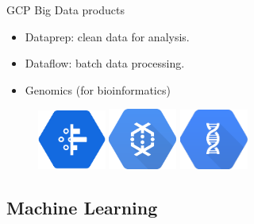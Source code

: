 \documentclass{beamer}
\begin{document}
\begin{frame}[fragile]{GCP Big Data products}
  \begin{itemize}[<+->]
    \item Dataprep: clean data for analysis.
    \item Dataflow: batch data processing.
    \item Genomics (for bioinformatics)
  \end{itemize}

  \vspace{1cm}
  \begin{figure}[H]
    \includegraphics[width=0.2\textwidth]{../img/dataprep}
    \hspace{1cm}   \includegraphics[width=0.2\textwidth]{../img/dataflow}
    \hspace{1cm}
     \includegraphics[width=0.2\textwidth]{../img/genomics}
  \end{figure}

\end{frame}

\subsection{Machine Learning}
\end{document}
